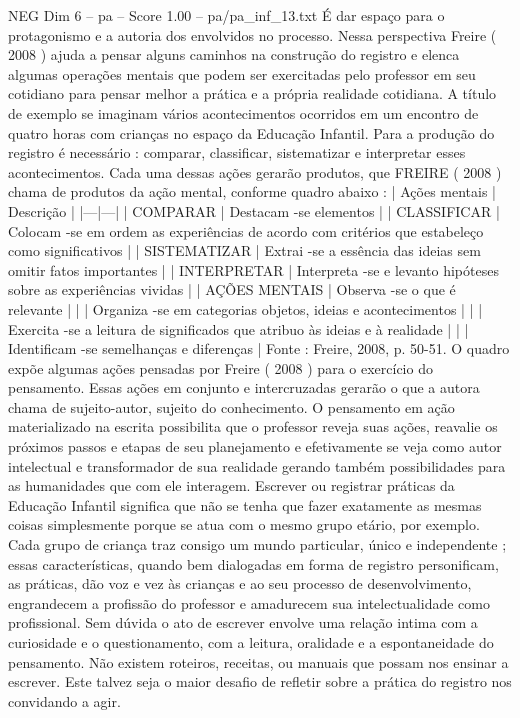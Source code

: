 \begin{textsample}{NEG Dim 6 – pa – Score 1.00 – pa/pa\_inf\_13.txt}
É dar espaço para o protagonismo e a autoria dos envolvidos no processo.
Nessa perspectiva Freire ( 2008 ) ajuda a pensar alguns caminhos na construção do registro e elenca algumas operações mentais que podem ser exercitadas pelo professor em seu cotidiano para pensar melhor a prática e a própria realidade cotidiana.
A título de exemplo se imaginam vários acontecimentos ocorridos em um encontro de quatro horas com crianças no espaço da Educação Infantil.
Para a produção do registro é necessário : comparar, classificar, sistematizar e interpretar esses acontecimentos.
Cada uma dessas ações gerarão produtos, que FREIRE ( 2008 ) chama de produtos da ação mental, conforme quadro abaixo : | Ações mentais | Descrição | |---|---| | COMPARAR | Destacam -se elementos | | CLASSIFICAR | Colocam -se em ordem as experiências de acordo com critérios que estabeleço como significativos | | SISTEMATIZAR | Extrai -se a essência das ideias sem omitir fatos importantes | | INTERPRETAR | Interpreta -se e levanto hipóteses sobre as experiências vividas | | AÇÕES MENTAIS | Observa -se o que é relevante | | | Organiza -se em categorias objetos, ideias e acontecimentos | | | Exercita -se a leitura de significados que atribuo às ideias e à realidade | | | Identificam -se semelhanças e diferenças | Fonte : Freire, 2008, p. 50-51.
O quadro expõe algumas ações pensadas por Freire ( 2008 ) para o exercício do pensamento.
Essas ações em conjunto e intercruzadas gerarão o que a autora chama de sujeito-autor, sujeito do conhecimento.
O pensamento em ação materializado na escrita possibilita que o professor reveja suas ações, reavalie os próximos passos e etapas de seu planejamento e efetivamente se veja como autor intelectual e transformador de sua realidade gerando também possibilidades para as humanidades que com ele interagem.
Escrever ou registrar práticas da Educação Infantil significa que não se tenha que fazer exatamente as mesmas coisas simplesmente porque se atua com o mesmo grupo etário, por exemplo.
Cada grupo de criança traz consigo um mundo particular, único e independente ; essas características, quando bem dialogadas em forma de registro personificam, as práticas, dão voz e vez às crianças e ao seu processo de desenvolvimento, engrandecem a profissão do professor e amadurecem sua intelectualidade como profissional.
Sem dúvida o ato de escrever envolve uma relação intima com a curiosidade e o questionamento, com a leitura, oralidade e a espontaneidade do pensamento.
Não existem roteiros, receitas, ou manuais que possam nos ensinar a escrever.
Este talvez seja o maior desafio de refletir sobre a prática do registro nos convidando a agir.

\end{textsample}
